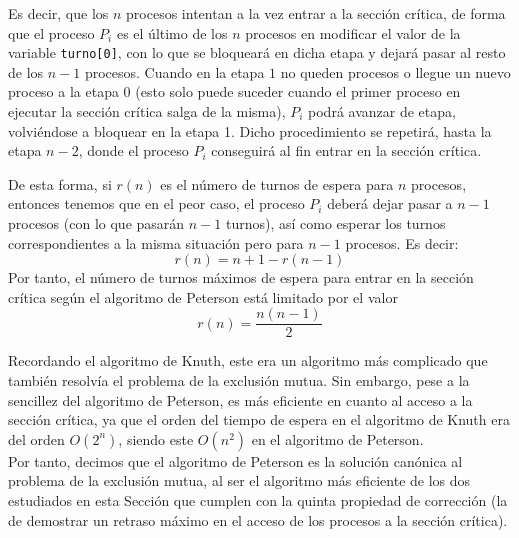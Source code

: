\begin{description}
        Es decir, que los $n$ procesos intentan a la vez entrar a la sección crítica, de forma que el proceso $P_i$ es el último de los $n$ procesos en modificar el valor de la variable \verb|turno[0]|, con lo que se bloqueará en dicha etapa y dejará pasar al resto de los $n-1$ procesos. Cuando en la etapa $1$ no queden procesos o llegue un nuevo proceso a la etapa 0 (esto solo puede suceder cuando el primer proceso en ejecutar la sección crítica salga de la misma), $P_i$ podrá avanzar de etapa, volviéndose a bloquear en la etapa 1. Dicho procedimiento se repetirá, hasta la etapa $n-2$, donde el proceso $P_i$ conseguirá al fin entrar en la sección crítica.

        De esta forma, si $r(n)$ es el número de turnos de espera para $n$ procesos, entonces tenemos que en el peor caso, el proceso $P_i$ deberá dejar pasar a $n-1$ procesos (con lo que pasarán $n-1$ turnos), así como esperar los turnos correspondientes a la misma situación pero para $n-1$ procesos. Es decir:
        \begin{equation*}
            r(n) = n+1-r(n-1)
        \end{equation*}
        Por tanto, el número de turnos máximos de espera para entrar en la sección crítica según el algoritmo de Peterson está limitado por el valor
        \begin{equation*}
            r(n) = \dfrac{n(n-1)}{2}
        \end{equation*}
\end{description}

Recordando el algoritmo de Knuth, este era un algoritmo más complicado que también resolvía el problema de la exclusión mutua. Sin embargo, pese a la sencillez del algoritmo de Peterson, es más eficiente en cuanto al acceso a la sección crítica, ya que el orden del tiempo de espera en el algoritmo de Knuth era del orden $O(2^n)$, siendo este $O(n^2)$ en el algoritmo de Peterson.\\

Por tanto, decimos que el algoritmo de Peterson es la solución canónica al problema de la exclusión mutua, al ser el algoritmo más eficiente de los dos estudiados en esta Sección que cumplen con la quinta propiedad de corrección (la de demostrar un retraso máximo en el acceso de los procesos a la sección crítica).


